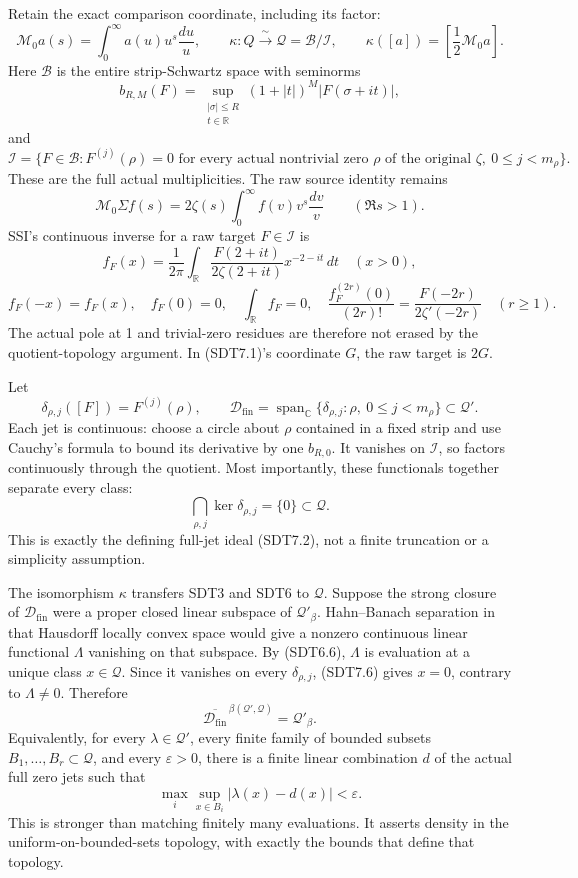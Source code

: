Retain the exact comparison coordinate, including its factor: \[
\mathcal M_0a(s)=\int_0^\infty a(u)u^s\frac{du}{u},
\qquad
\kappa:Q\xrightarrow{\ \sim\ }\mathcal Q=\mathcal B/\mathcal I,
\qquad
\kappa([a])=\left[\frac12\mathcal M_0a\right].
\tag{SDT7.1}
\] Here \(\mathcal B\) is the entire strip-Schwartz space with seminorms
\[
b_{R,M}(F)=\sup_{\substack{|\sigma|\le R\\t\in\mathbb R}}
(1+|t|)^M|F(\sigma+it)|,
\] and \[
\mathcal I=\{F\in\mathcal B:
F^{(j)}(\rho)=0\text{ for every actual nontrivial zero }\rho
\text{ of the original }\zeta,\ 0\le j<m_\rho\}.
\tag{SDT7.2}
\] These are the full actual multiplicities. The raw source identity
remains \[
\mathcal M_0\Sigma f(s)
=2\zeta(s)\int_0^\infty f(v)v^s\frac{dv}{v}
\qquad(\Re s>1).
\tag{SDT7.3}
\] SSI's continuous inverse for a raw target \(F\in\mathcal I\) is \[
f_F(x)=\frac1{2\pi}\int_{\mathbb R}
\frac{F(2+it)}{2\zeta(2+it)}x^{-2-it}\,dt\quad(x>0),
\] \[
f_F(-x)=f_F(x),\quad f_F(0)=0,\quad\int_{\mathbb R}f_F=0,\quad
\frac{f_F^{(2r)}(0)}{(2r)!}=\frac{F(-2r)}{2\zeta'(-2r)}
\quad(r\ge1).
\tag{SDT7.4}
\] The actual pole at 1 and trivial-zero residues are therefore not
erased by the quotient-topology argument. In (SDT7.1)'s coordinate
\(G\), the raw target is \(2G\).

Let \[
\delta_{\rho,j}([F])=F^{(j)}(\rho),\qquad
\mathscr D_{\mathrm{fin}}
=\operatorname{span}_{\mathbb C}
\{\delta_{\rho,j}:\rho,\ 0\le j<m_\rho\}\subset\mathcal Q'.
\tag{SDT7.5}
\] Each jet is continuous: choose a circle about \(\rho\) contained in a
fixed strip and use Cauchy's formula to bound its derivative by one
\(b_{R,0}\). It vanishes on \(\mathcal I\), so factors continuously
through the quotient. Most importantly, these functionals together
separate every class: \[
\bigcap_{\rho,j}\ker\delta_{\rho,j}=\{0\}\subset\mathcal Q.
\tag{SDT7.6}
\] This is exactly the defining full-jet ideal (SDT7.2), not a finite
truncation or a simplicity assumption.

The isomorphism \(\kappa\) transfers SDT3 and SDT6 to \(\mathcal Q\).
Suppose the strong closure of \(\mathscr D_{\mathrm{fin}}\) were a
proper closed linear subspace of \(\mathcal Q'_\beta\). Hahn--Banach
separation in that Hausdorff locally convex space would give a nonzero
continuous linear functional \(\Lambda\) vanishing on that subspace. By
(SDT6.6), \(\Lambda\) is evaluation at a unique class
\(x\in\mathcal Q\). Since it vanishes on every \(\delta_{\rho,j}\),
(SDT7.6) gives \(x=0\), contrary to \(\Lambda\ne0\). Therefore \[
\boxed{\overline{\mathscr D_{\mathrm{fin}}}^{\,\beta(\mathcal Q',\mathcal Q)}
=\mathcal Q'_\beta.}
\tag{SDT7.7}
\] Equivalently, for every \(\lambda\in\mathcal Q'\), every finite
family of bounded subsets \(B_1,\ldots,B_r\subset\mathcal Q\), and every
\(\varepsilon>0\), there is a finite linear combination \(d\) of the
actual full zero jets such that \[
\max_i\sup_{x\in B_i}|\lambda(x)-d(x)|<\varepsilon.
\tag{SDT7.8}
\] This is stronger than matching finitely many evaluations. It asserts
density in the uniform-on-bounded-sets topology, with exactly the bounds
that define that topology.

